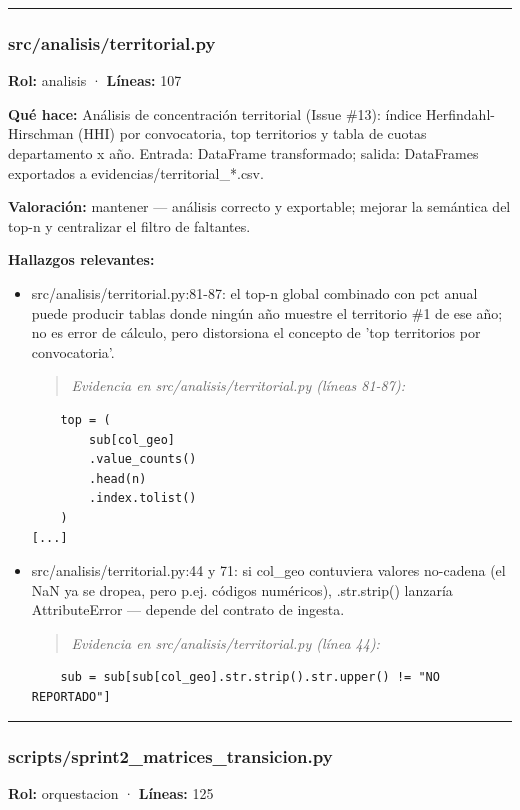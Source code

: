 \medskip
\hrule

\subsubsection{src/analisis/territorial.py}
\textbf{Rol:} analisis · \textbf{Líneas:} 107

\textbf{Qué hace:} Análisis de concentración territorial (Issue \#13): índice Herfindahl-Hirschman (HHI) por convocatoria, top territorios y tabla de cuotas departamento x año. Entrada: DataFrame transformado; salida: DataFrames exportados a evidencias/territorial\_*.csv.

\textbf{Valoración:} mantener --- análisis correcto y exportable; mejorar la semántica del top-n y centralizar el filtro de faltantes.

\textbf{Hallazgos relevantes:}
\begin{itemize}
  \item src/analisis/territorial.py:81-87: el top-n global combinado con pct anual puede producir tablas donde ningún año muestre el territorio \#1 de ese año; no es error de cálculo, pero distorsiona el concepto de 'top territorios por convocatoria'.
\begin{quote}\footnotesize\ttfamily
\noindent\emph{Evidencia en src/analisis/territorial.py (líneas 81-87):}
\end{quote}
\begin{lstlisting}
    top = (
        sub[col_geo]
        .value_counts()
        .head(n)
        .index.tolist()
    )
[...]
\end{lstlisting}

  \item src/analisis/territorial.py:44 y 71: si col\_geo contuviera valores no-cadena (el NaN ya se dropea, pero p.ej. códigos numéricos), .str.strip() lanzaría AttributeError --- depende del contrato de ingesta.
\begin{quote}\footnotesize\ttfamily
\noindent\emph{Evidencia en src/analisis/territorial.py (línea 44):}
\end{quote}
\begin{lstlisting}
    sub = sub[sub[col_geo].str.strip().str.upper() != "NO REPORTADO"]
\end{lstlisting}

\end{itemize}

\medskip
\hrule

\subsubsection{scripts/sprint2\_matrices\_transicion.py}
\textbf{Rol:} orquestacion · \textbf{Líneas:} 125

